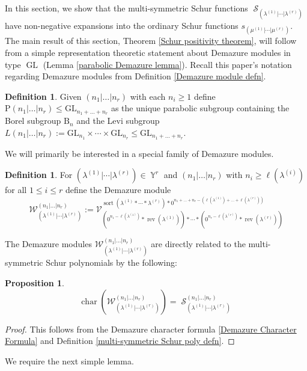 \documentclass[12pt,reqno]{amsart}
\theoremstyle{definition}
\newtheorem{prop}[thm]{Proposition}
\newtheorem{defn}[thm]{Definition}
\DeclareMathOperator{\Par}{\mathbb{Y}}
\DeclareMathOperator{\Char}{\mathrm{char}}
\DeclareMathOperator{\GL}{\mathrm{GL}}
\DeclareMathOperator{\sort}{sort}
\DeclareMathOperator{\rev}{rev}
\DeclareMathOperator{\cS}{\mathcal{S}}
\begin{document}
In this section, we show that the multi-symmetric Schur functions $\cS_{(\lambda^{(1)}|\cdots | \lambda^{(r)})}$ have non-negative expansions into the ordinary Schur functions $s_{(\mu^{(1)}|\cdots |\mu^{(r)})}.$ The main result of this section, Theorem \ref{Schur positivity theorem}, will follow from a simple representation theoretic statement about Demazure modules in type $\GL$ (Lemma \ref{parabolic Demazure lemma}). Recall this paper's notation regarding Demazure modules from Definition \ref{Demazure module defn}.


\begin{defn}
    Given $(n_1|\ldots | n_r)$ with each $n_i \geq 1$ define $\mathrm{P}(n_1|\ldots|n_r) \leq \mathrm{GL}_{n_1+\ldots+n_r}$ as the unique parabolic subgroup containing the Borel subgroup $\mathrm{B}_n$ and the Levi subgroup $L(n_1|\ldots|n_r):= \mathrm{GL}_{n_1}\times \cdots \times \mathrm{GL}_{n_r} \leq \mathrm{GL}_{n_1+\ldots+n_r}.$
\end{defn}

We will primarily be interested in a special family of Demazure modules.

\begin{defn}
    For $(\lambda^{(1)}|\cdots|\lambda^{(r)}) \in \Par^r$ and $(n_1|\ldots|n_r)$ with $n_i \geq \ell(\lambda^{(i)})$ for all $1\leq i \leq r$ define the Demazure module 
    $$\mathcal{W}_{(\lambda^{(1)}|\cdots | \lambda^{(r)})}^{(n_1|\ldots|n_r)}:= \mathcal{V}^{\sort(\lambda^{(1)}*\cdots *\lambda^{(r)})*0^{n_1+\ldots+n_r - (\ell(\lambda^{(1)})+\ldots + \ell(\lambda^{(r)}))}}_{(0^{n_1-\ell(\lambda^{(1)})}*\rev(\lambda^{(1)}))       *\cdots*(0^{n_r-\ell(\lambda^{(r)})}*\rev(\lambda^{(r)}))}$$
\end{defn}

The Demazure modules $\mathcal{W}_{(\lambda^{(1)}|\cdots | \lambda^{(r)})}^{(n_1|\ldots|n_r)}$ are directly related to the multi-symmetric Schur polynomials by the following:

\begin{prop}
$$\Char(\mathcal{W}_{(\lambda^{(1)}|\cdots | \lambda^{(r)})}^{(n_1|\ldots|n_r)}) = \cS_{(\lambda^{(1)}|\cdots | \lambda^{(r)})}^{(n_1|\ldots|n_r)}$$
\end{prop}
\begin{proof}
    This follows from the Demazure character formula \ref{Demazure Character Formula} and Definition \ref{multi-symmetric Schur poly defn}.
\end{proof}

We require the next simple lemma.
\end{document}
